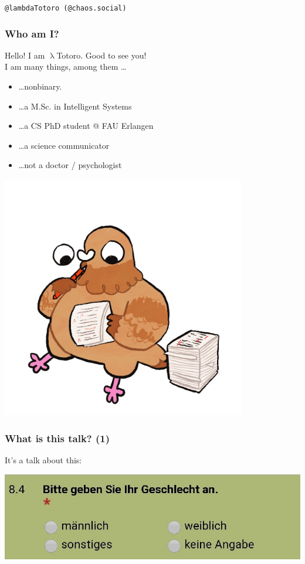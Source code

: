 \documentclass[aspectratio=169,x11names]{beamer}
\begin{document}
\begin{frame}
\begin{center}
\texttt{@lambdaTotoro (@chaos.social)}
\end{center}
\end{frame}

\begin{frame}
\frametitle{Who am I?}

\begin{minipage}{0.5\textwidth}
Hello! I am $\uplambda$Totoro. Good to see you!\\
I am many things, among them \dots
\bigskip

\begin{itemize}
\item\dots nonbinary.
\item\dots a M.Sc. in Intelligent Systems
\item\dots a CS PhD student @ FAU Erlangen
\item\dots a science communicator
\item\dots not a doctor / psychologist
\end{itemize}
\end{minipage}%
\begin{minipage}{0.5\textwidth}
\begin{center}
\includegraphics[width=0.8\textwidth,keepaspectratio]{images/pigeon_jonas} 
\end{center}
\end{minipage}
\end{frame}

\begin{frame}
\frametitle{What is this talk? (1)}
\large
It's a talk about this:\medskip

\begin{center}
\includegraphics[scale=0.45]{images/Simba_01}
\end{center}
\end{frame}
\end{document}
